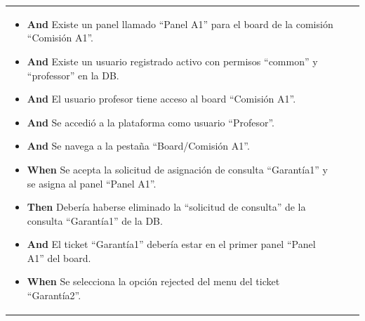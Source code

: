 \begin{longtable}{|p{1cm}|p{2.5cm}|p{12cm}|}
\begin{itemize}
        \item \textbf{And} Existe un panel llamado ``Panel A1'' para el board de la comisión ``Comisión A1''.
        \item \textbf{And} Existe un usuario registrado activo con permisos ``common'' y ``professor'' en la DB.
        \item \textbf{And} El usuario profesor tiene acceso al board ``Comisión A1''.
        \item \textbf{And} Se accedió a la plataforma como usuario ``Profesor''.
        \item \textbf{And} Se navega a la pestaña ``Board/Comisión A1''.
        \newline
        \item \textbf{When} Se acepta la solicitud de asignación de consulta ``Garant\'ia1'' y se asigna al panel ``Panel A1''.
        \newline
        
        \item \textbf{Then} Debería haberse eliminado la ``solicitud de consulta'' de la consulta ``Garant\'ia1'' de la DB.
        \item \textbf{And} El ticket ``Garant\'ia1'' debería estar en el primer panel ``Panel A1'' del board.
        \newline
        
        \item \textbf{When} Se selecciona la opción rejected del menu del ticket ``Garant\'ia2''.
        \newline


\end{itemize}
\end{longtable}
